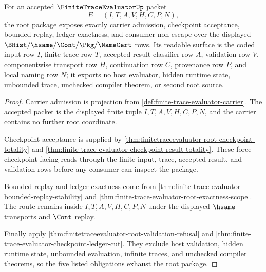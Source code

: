 \begin{theorem}
\label{thm:finite-trace-evaluator-root-obligation-package}
For an accepted $\FiniteTraceEvaluatorUp$ packet
$$
E=(I,T,A,V,H,C,P,N),
$$
the root package exposes exactly carrier admission, checkpoint acceptance,
bounded replay, ledger exactness, and consumer non-escape over the displayed
$\BHist/\hsame/\Cont/\Pkg/\NameCert$ rows. Its readable surface is the coded
input row $I$, finite trace row $T$, accepted-result classifier row $A$,
validation row $V$, componentwise transport row $H$, continuation row $C$,
provenance row $P$, and local naming row $N$; it exports no host evaluator,
hidden runtime state, unbounded trace, unchecked compiler theorem, or second
root source.
\end{theorem}
\begin{proof}
Carrier admission is projection from
\autoref{def:finite-trace-evaluator-carrier}. The accepted packet is the
displayed finite tuple $I,T,A,V,H,C,P,N$, and the carrier contains no further
root coordinate.

Checkpoint acceptance is supplied by
\autoref{thm:finitetraceevaluator-root-checkpoint-totality} and
\autoref{thm:finite-trace-evaluator-checkpoint-result-totality}. These force
checkpoint-facing reads through the finite input, trace, accepted-result, and
validation rows before any consumer can inspect the package.

Bounded replay and ledger exactness come from
\autoref{thm:finite-trace-evaluator-bounded-replay-stability} and
\autoref{thm:finite-trace-evaluator-root-exactness-scope}. The route remains
inside $I,T,A,V,H,C,P,N$ under the displayed $\hsame$ transports and $\Cont$
replay.

Finally apply \autoref{thm:finitetraceevaluator-root-validation-refusal} and
\autoref{thm:finite-trace-evaluator-checkpoint-ledger-cut}. They exclude host
validation, hidden runtime state, unbounded evaluation, infinite traces, and
unchecked compiler theorems, so the five listed obligations exhaust the root
package.
\end{proof}

